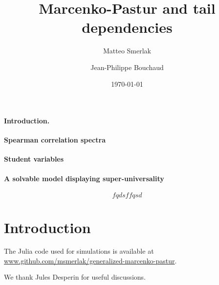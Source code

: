 \documentclass[
 prl,
 twocolumn,
 amsmath,
 amssymb,
 aps,
]{revtex4-2}
\begin{document}
\title{Marcenko-Pastur and tail dependencies}

\author{Matteo Smerlak}


\author{Jean-Philippe Bouchaud}

\date{\today}

\begin{abstract}
    
\end{abstract}
\maketitle

\paragraph*{Introduction.}



\paragraph*{Spearman correlation spectra}

\paragraph*{Student variables}

\paragraph*{A solvable model displaying super-universality}




\begin{equation}
    fqdsffqsd
\end{equation}
\section{Introduction}


\medskip
The Julia code used for simulations is available at \url{www.github.com/msmerlak/generalized-marcenko-pastur}.

\medskip

\begin{acknowledgments}
We thank Jules Desperin for useful discussions. 
\end{acknowledgments}

\medskip



\end{document}
